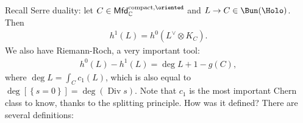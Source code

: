 \begin{remark}

Recall Serre duality: let
\(C\in {\mathsf{Mfd}}_{\mathbb{C}}^{\operatorname{compact},\oriented}\)
and \(L\to C \in \Bun(\Holo)\). Then
\begin{align*}
h^1(L) = h^0(L^\vee\otimes K_C)
.\end{align*}
We also have Riemann-Roch, a very important tool:
\begin{align*}
h^0(L) - h^1(L) = \deg L + 1 - g(C)
,\end{align*}
where \(\deg L = \int_C c_1(L)\), which is also equal to
\(\deg [ \left\{{ s = 0 }\right\}] = \deg(\operatorname{Div}s)\). Note
that \(c_1\) is the most important Chern class to know, thanks to the
splitting principle. How was it defined? There are several definitions:


\end{remark}
